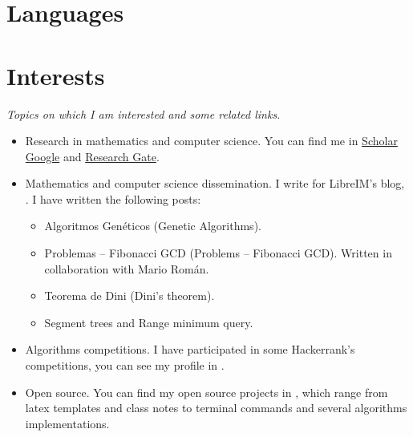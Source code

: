\documentclass[10pt,a4paper,sans]{moderncv} %
\begin{document}

\pagebreak

\section{Languages}



\section{Interests}

\begin{center}
\textit{Topics on which I am interested and some related links.}
\end{center}
\begin{itemize}
    \item{Research in mathematics and computer science. You can find me in \textcolor{color1}{\href{https://scholar.google.es/citations?user=oLAt2JsAAAAJ&hl=es}{Scholar Google}} and \textcolor{color1}{\href{https://www.researchgate.net/profile/Andres_Herrera-Poyatos}{Research Gate}}.}
    \item Mathematics and computer science dissemination. I write for LibreIM's blog, \textcolor{color1}{}. I have written the following posts:
    	\begin{itemize}
    		\item Algoritmos Genéticos (Genetic Algorithms).
    		\item Problemas -- Fibonacci GCD (Problems -- Fibonacci GCD). Written in collaboration with Mario Román.
    		\item Teorema de Dini (Dini's theorem).
    		\item Segment trees and Range minimum query.
    	\end{itemize}
    \item Algorithms competitions. I have participated in some Hackerrank's competitions, you can see my profile in \textcolor{color1}{}.
    \item Open source. You can find my open source projects in \textcolor{color1}{}, which range from latex templates and class notes to terminal commands and several algorithms implementations.
\end{itemize}
\end{document}
